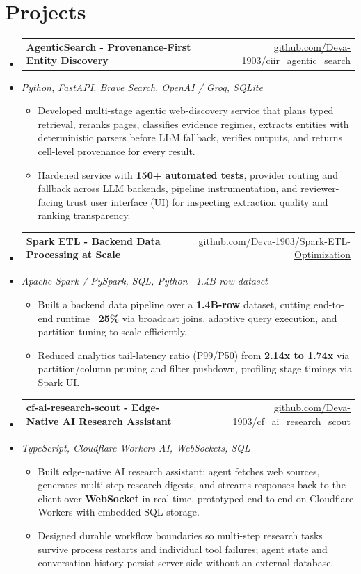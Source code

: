 \documentclass[letterpaper,10pt]{article}
\makeatletter
\newcommand{\resumeItem}[1]{
  \item\small{#1\vspace{-1pt}}
}
\newcommand{\resumeProjectHeading}[2]{
    \item
    \begin{tabular*}{0.985\textwidth}[t]{l@{\extracolsep{\fill}}r}
      \small\textbf{#1} & \small #2 \\
    \end{tabular*}\vspace{-5pt}
}
\newcommand{\resumeProjectSubheading}[1]{
  \vspace{-2pt}\item[] {\small\textcolor{ResumeSlate}{\emph{#1}}}\vspace{-3pt}
}
\newcommand{\resumeSubHeadingListStart}{\begin{itemize}[leftmargin=0.0in, label={}, itemsep=2pt, topsep=2pt]}
\newcommand{\resumeSubHeadingListEnd}{\end{itemize}}
\newcommand{\resumeItemListStart}{\begin{itemize}[leftmargin=0.18in, itemsep=2pt, topsep=1pt]}
\newcommand{\resumeItemListEnd}{\end{itemize}\vspace{-4pt}}
\makeatother
\begin{document}
\section{Projects}
\resumeSubHeadingListStart
  \resumeProjectHeading
    {AgenticSearch - Provenance-First Entity Discovery}
    {\href{https://github.com/Deva-1903/ciir_agentic_search}{github.com/Deva-1903/ciir\_agentic\_search}}
  \resumeProjectSubheading{Python, FastAPI, Brave Search, OpenAI / Groq, SQLite}
    \resumeItemListStart
      \resumeItem{Developed multi-stage agentic web-discovery service that plans typed retrieval, reranks pages, classifies evidence regimes, extracts entities with deterministic parsers before LLM fallback, verifies outputs, and returns cell-level provenance for every result.}
      \resumeItem{Hardened service with \textbf{150+ automated tests}, provider routing and fallback across LLM backends, pipeline instrumentation, and reviewer-facing trust user interface (UI) for inspecting extraction quality and ranking transparency.}
    \resumeItemListEnd
  \resumeProjectHeading
    {Spark ETL - Backend Data Processing at Scale}
    {\href{https://github.com/Deva-1903/Spark-ETL-Optimization}{github.com/Deva-1903/Spark-ETL-Optimization}}
  \resumeProjectSubheading{Apache Spark / PySpark, SQL, Python \enspace\textbar\enspace ~1.4B-row dataset}
    \resumeItemListStart
      \resumeItem{Built a backend data pipeline over a \textbf{1.4B-row} dataset, cutting end-to-end runtime \textbf{~25\%} via broadcast joins, adaptive query execution, and partition tuning to scale efficiently.}
      \resumeItem{Reduced analytics tail-latency ratio (P99/P50) from \textbf{2.14x to 1.74x} via partition/column pruning and filter pushdown, profiling stage timings via Spark UI.}
    \resumeItemListEnd
  \resumeProjectHeading
    {cf-ai-research-scout - Edge-Native AI Research Assistant}
    {\href{https://github.com/Deva-1903/cf_ai_research_scout}{github.com/Deva-1903/cf\_ai\_research\_scout}}
  \resumeProjectSubheading{TypeScript, Cloudflare Workers AI, WebSockets, SQL}
    \resumeItemListStart
      \resumeItem{Built edge-native AI research assistant: agent fetches web sources, generates multi-step research digests, and streams responses back to the client over \textbf{WebSocket} in real time, prototyped end-to-end on Cloudflare Workers with embedded SQL storage.}
      \resumeItem{Designed durable workflow boundaries so multi-step research tasks survive process restarts and individual tool failures; agent state and conversation history persist server-side without an external database.}
    \resumeItemListEnd
\resumeSubHeadingListEnd
\vspace{-4pt}
\end{document}
